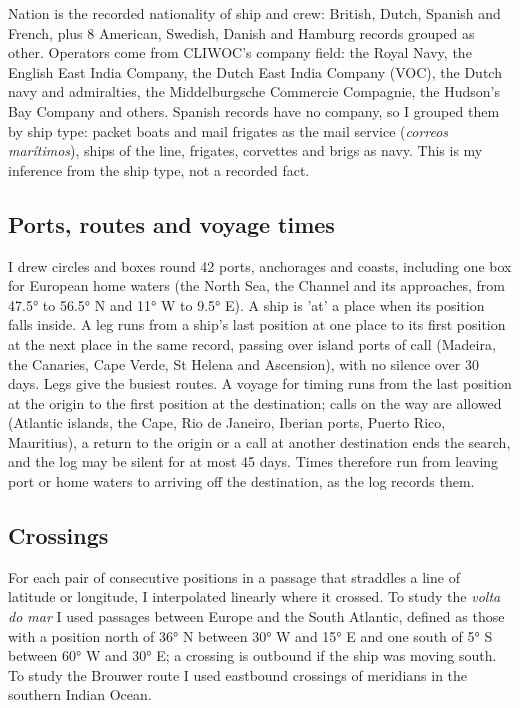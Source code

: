 \documentclass[11pt,a4paper]{article}
\begin{document}
Nation is the recorded nationality of ship and crew: British, Dutch, Spanish and French, plus 8 American, Swedish, Danish and Hamburg records grouped as other. Operators come from CLIWOC's company field: the Royal Navy, the English East India Company, the Dutch East India Company (VOC), the Dutch navy and admiralties, the Middelburgsche Commercie Compagnie, the Hudson's Bay Company and others. Spanish records have no company, so I grouped them by ship type: packet boats and mail frigates as the mail service (\emph{correos marítimos}), ships of the line, frigates, corvettes and brigs as navy. This is my inference from the ship type, not a recorded fact.

\subsection{Ports, routes and voyage times}
I drew circles and boxes round 42 ports, anchorages and coasts, including one box for European home waters (the North Sea, the Channel and its approaches, from 47.5° to 56.5° N and 11° W to 9.5° E). A ship is 'at' a place when its position falls inside. A leg runs from a ship's last position at one place to its first position at the next place in the same record, passing over island ports of call (Madeira, the Canaries, Cape Verde, St Helena and Ascension), with no silence over 30 days. Legs give the busiest routes. A voyage for timing runs from the last position at the origin to the first position at the destination; calls on the way are allowed (Atlantic islands, the Cape, Rio de Janeiro, Iberian ports, Puerto Rico, Mauritius), a return to the origin or a call at another destination ends the search, and the log may be silent for at most 45 days. Times therefore run from leaving port or home waters to arriving off the destination, as the log records them.

\subsection{Crossings}
For each pair of consecutive positions in a passage that straddles a line of latitude or longitude, I interpolated linearly where it crossed. To study the \emph{volta do mar} I used passages between Europe and the South Atlantic, defined as those with a position north of 36° N between 30° W and 15° E and one south of 5° S between 60° W and 30° E; a crossing is outbound if the ship was moving south. To study the Brouwer route I used eastbound crossings of meridians in the southern Indian Ocean.
\end{document}
